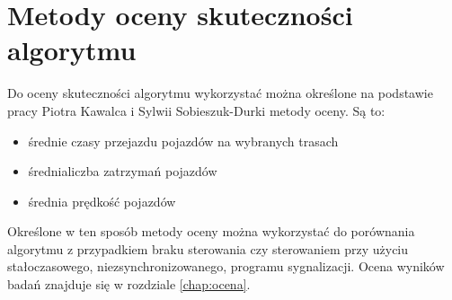\section{Metody oceny skuteczności algorytmu}
Do oceny skuteczności algorytmu wykorzystać można określone na podstawie pracy Piotra Kawalca i Sylwii Sobieszuk-Durki \cite{kawalec+sobieszuk-durka} metody oceny. Są to:
\begin{itemize}
	\item średnie czasy przejazdu pojazdów na wybranych trasach
	\item średnialiczba zatrzymań pojazdów
	\item średnia prędkość pojazdów
\end{itemize}

Określone w ten sposób metody oceny można wykorzystać do porównania algorytmu z przypadkiem braku sterowania czy sterowaniem przy użyciu stałoczasowego, niezsynchronizowanego, programu sygnalizacji. Ocena wyników badań znajduje się w rozdziale \ref{chap:ocena}.